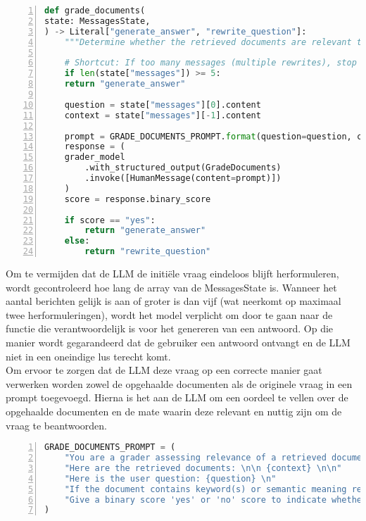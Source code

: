 \begin{lstlisting}[basicstyle=\small, frame=single, breaklines=true, postbreak=\mbox{\textcolor{red}{$\hookrightarrow$}\space}, escapeinside ={\%,}, escapechar={!}, numbers=left, language=Python, caption=Functie die beslist tussen antwoord genereren of vraag herschrijven]
def grade_documents(
state: MessagesState,
) -> Literal["generate_answer", "rewrite_question"]:
    """Determine whether the retrieved documents are relevant to the question."""
    
    # Shortcut: If too many messages (multiple rewrites), stop rewriting
    if len(state["messages"]) >= 5:
    return "generate_answer"
    
    question = state["messages"][0].content
    context = state["messages"][-1].content
    
    prompt = GRADE_DOCUMENTS_PROMPT.format(question=question, context=context)
    response = (
    grader_model
        .with_structured_output(GradeDocuments)
        .invoke([HumanMessage(content=prompt)])
    )
    score = response.binary_score
    
    if score == "yes":
        return "generate_answer"
    else:
        return "rewrite_question"
\end{lstlisting}

Om te vermijden dat de LLM de initiële vraag eindeloos blijft herformuleren, wordt gecontroleerd hoe lang de array van de MessagesState is. Wanneer het aantal berichten gelijk is aan of groter is dan vijf (wat neerkomt op maximaal twee herformuleringen), wordt het model verplicht om door te gaan naar de functie die verantwoordelijk is voor het genereren van een antwoord. Op die manier wordt gegarandeerd dat de gebruiker een antwoord ontvangt en de LLM niet in een oneindige lus terecht komt.
\\[1em]
Om ervoor te zorgen dat de LLM deze vraag op een correcte manier gaat verwerken worden zowel de opgehaalde documenten als de originele vraag in een prompt toegevoegd. Hierna is het aan de LLM om een oordeel te vellen over de opgehaalde documenten en de mate waarin deze relevant en nuttig zijn om de vraag te beantwoorden.
\begin{lstlisting}[basicstyle=\small, frame=single, breaklines=true, postbreak=\mbox{\textcolor{red}{$\hookrightarrow$}\space}, escapeinside ={\%,}, escapechar={!}, numbers=left, language=Python, caption=Prompt om opgehaalde documenten te beoordelen op basis van de gestelde vraag]
GRADE_DOCUMENTS_PROMPT = (
    "You are a grader assessing relevance of a retrieved document to a user question. \n "
    "Here are the retrieved documents: \n\n {context} \n\n"
    "Here is the user question: {question} \n"
    "If the document contains keyword(s) or semantic meaning related to the user question, grade it as relevant. \n"
    "Give a binary score 'yes' or 'no' score to indicate whether the document is relevant to the question."
)
\end{lstlisting}

